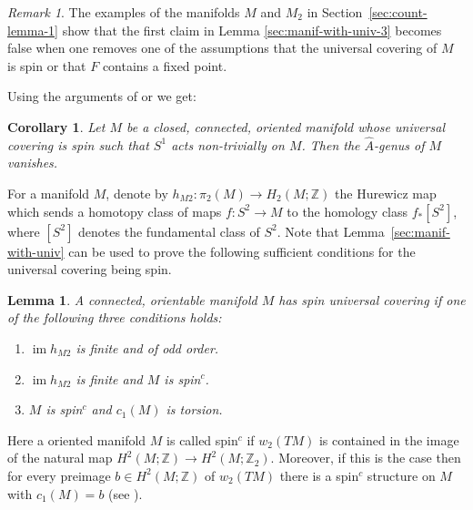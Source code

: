 \documentclass[a4paper, 11pt]{amsart}
\newtheorem{lemma}[theorem]{Lemma}
\newtheorem{corollary}[theorem]{Corollary}
\theoremstyle{definition}
\theoremstyle{remark}
\newtheorem{remark}[theorem]{Remark}
\numberwithin{equation}{section}
\DeclareMathOperator{\image}{im}
\begin{document}
\begin{remark}
  The examples of the manifolds \(M\) and \(M_2\) in Section~\ref{sec:count-lemma-1} show that the first claim in Lemma \ref{sec:manif-with-univ-3} becomes false when one removes one of the assumptions that the universal covering of \(M\) is spin or that \(F\) contains a fixed point.
\end{remark}

Using the arguments of \cite[Section 1.5]{MR1066570} or \cite[Section 1.4]{MR1979364} we get:

\begin{corollary}
  \label{sec:manif-with-univ-4}
    Let \(M\) be a closed, connected, oriented manifold whose universal covering is spin such that \(S^1\) acts non-trivially on \(M\).
  Then the \(\hat{A}\)-genus of \(M\) vanishes.
\end{corollary}

For a manifold \(M\), denote by \(h_{M2}:\pi_2(M)\rightarrow H_2(M;\mathbb{Z})\) the Hurewicz map which sends a homotopy class of maps \(f:S^2\rightarrow M\) to the homology class \(f_*[S^2]\), where \([S^2]\) denotes the fundamental class of \(S^2\).
Note that Lemma~\ref{sec:manif-with-univ} can be used to prove the following sufficient conditions for the universal covering being spin.

\begin{lemma}
  \label{sec:manif-with-univ-2}
  A connected, orientable manifold \(M\) has spin universal covering if one of the following three conditions holds:
  \begin{enumerate}
  \item \(\image h_{M2}\) is finite and of odd order.
  \item \(\image h_{M2}\) is finite and \(M\) is spin$^c$.
  \item \(M\) is spin$^c$ and \(c_1(M)\) is torsion.
  \end{enumerate}
\end{lemma}

Here a oriented manifold \(M\)  is called spin$^c$ if \(w_2(TM)\) is contained in the image of the natural map \(H^2(M;\mathbb{Z})\rightarrow H^2(M;\mathbb{Z}_2)\). Moreover, if this is the case then for every preimage \(b\in H^2(M;\mathbb{Z})\) of \(w_2(TM)\) there is a spin$^c$ structure on \(M\) with \(c_1(M)=b\) (see \cite[Appendix D]{MR1031992}).
 
\end{document}
